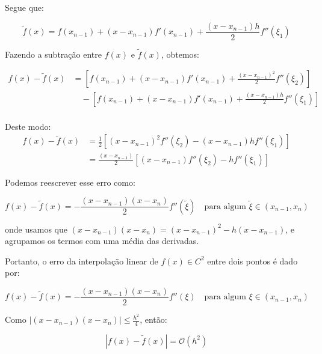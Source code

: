 \documentclass[12pt, a4paper]{article} %
\begin{document}
        Segue que:

        \begin{equation*}
            \tilde{f}(x) = f(x_{n-1}) + (x - x_{n-1}) f'(x_{n-1}) + \frac{(x - x_{n-1}) h}{2} f''(\xi_1)
        \end{equation*}

        Fazendo a subtração entre $f(x)$ e $\tilde{f}(x)$, obtemos:

        \begin{align*}
        f(x) - \tilde{f}(x)
        &= \left[ f(x_{n-1}) + (x - x_{n-1}) f'(x_{n-1}) + \frac{(x - x_{n-1})^2}{2} f''(\xi_2) \right] \\
        &\quad - \left[ f(x_{n-1}) + (x - x_{n-1}) f'(x_{n-1}) + \frac{(x - x_{n-1}) h}{2} f''(\xi_1) \right] \\
        \end{align*}

        Deste modo:
        \begin{align*}
        f(x) - \tilde{f}(x)
        &= \frac{1}{2} \left[ (x - x_{n-1})^2 f''(\xi_2) - (x - x_{n-1}) h f''(\xi_1) \right] \\
        &= \frac{(x - x_{n-1})}{2} \left[ (x - x_{n-1}) f''(\xi_2) - h f''(\xi_1) \right]
        \end{align*}

        Podemos reescrever esse erro como:

        \begin{equation*}
        f(x) - \tilde{f}(x) = -\frac{(x - x_{n-1})(x - x_n)}{2} f''(\tilde{\xi})
        \quad \text{para algum } \tilde{\xi} \in (x_{n-1}, x_n)
        \end{equation*}

        onde usamos que $(x - x_{n-1})(x - x_n) = (x - x_{n-1})^2 - h(x - x_{n-1})$, e agrupamos os termos com uma média das derivadas.

        Portanto, o erro da interpolação linear de $f(x) \in C^2$ entre dois pontos é dado por:

        \begin{equation*}
        \boxed{
        f(x) - \tilde{f}(x) = -\frac{(x - x_{n-1})(x - x_n)}{2} f''(\xi)
        \quad \text{para algum } \xi \in (x_{n-1}, x_n)
        }
        \end{equation*}

        Como $|(x - x_{n-1})(x - x_n)| \le \frac{h^2}{4}$, então:

        \begin{equation*}
        |f(x) - \tilde{f}(x)| = \mathcal{O}(h^2)
        \end{equation*}
\end{document}
